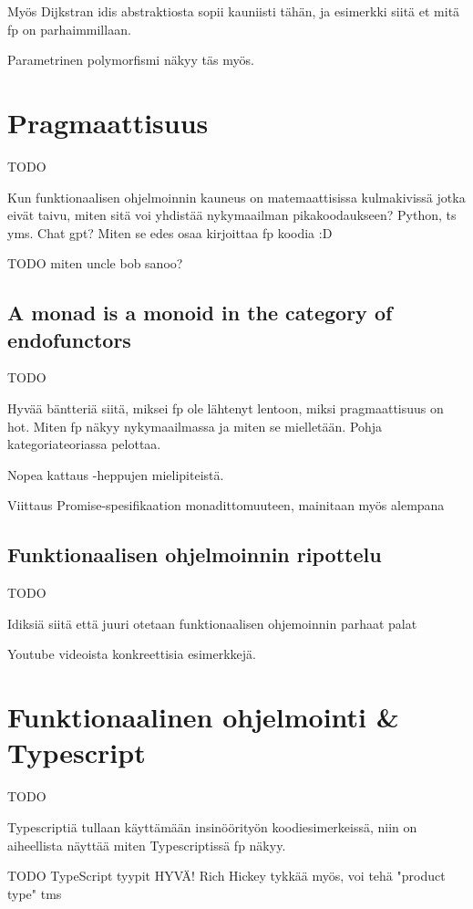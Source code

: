 Myös Dijkstran idis abstraktiosta sopii kauniisti tähän, ja esimerkki siitä et mitä \gls{fp} on parhaimmillaan.

Parametrinen polymorfismi näkyy täs myös.

\section{Pragmaattisuus}

TODO

Kun funktionaalisen ohjelmoinnin kauneus on matemaattisissa kulmakivissä jotka eivät taivu, miten sitä voi yhdistää nykymaailman pikakoodaukseen? Python, \gls{ts} yms. Chat gpt? Miten se edes osaa kirjoittaa fp koodia :D

TODO miten uncle bob sanoo? \cite{martin2017pragmaticfp}

\subsection{A monad is a monoid in the category of endofunctors}

TODO

Hyvää bäntteriä siitä, miksei fp ole lähtenyt lentoon, miksi pragmaattisuus on hot. Miten fp näkyy nykymaailmassa ja miten se mielletään. Pohja kategoriateoriassa pelottaa.

Nopea kattaus  -heppujen mielipiteistä.

Viittaus Promise-spesifikaation monadittomuuteen, mainitaan myös alempana

\subsection{Funktionaalisen ohjelmoinnin ripottelu}

TODO

Idiksiä siitä että juuri otetaan funktionaalisen ohjemoinnin parhaat palat

Youtube videoista konkreettisia esimerkkejä.

\section{Funktionaalinen ohjelmointi \& Typescript}


TODO

Typescriptiä tullaan käyttämään insinöörityön koodiesimerkeissä, niin on aiheellista näyttää miten Typescriptissä \gls{fp} näkyy.

TODO TypeScript tyypit HYVÄ! Rich Hickey tykkää myös, voi tehä "product type" tms

